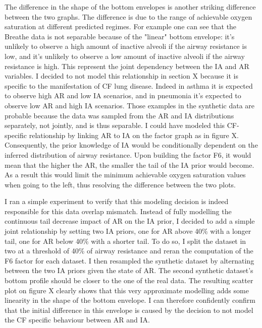 The difference in the shape of the bottom envelopes is another striking difference between the two graphs. The difference is due to the range of achievable oxygen saturation at different predicted \F regimes. 
For example one can see that the Breathe data is not separable because of the "linear" bottom envelope: it’s unlikely to observe a high amount of inactive alveoli if the airway resistance is low, and it’s unlikely to observe a low amount of inactive alveoli if the airway resistance is high. This represent the joint dependency between the IA and AR variables. I decided to not model this relationship in section X because it is specific to the manifestation of CF lung disease. Indeed in asthma it is expected to observe high AR and low IA scenarios, and in pneumonia it’s expected to observe low AR and high IA scenarios. Those examples in the synthetic data are probable because the data was sampled from the AR and IA distributions separately, not jointly, and is thus separable.
I could have modeled this CF-specific relationship by linking AR to IA on the factor graph as in figure X. Consequently, the prior knowledge of IA would be conditionally dependent on the inferred distribution of airway resistance. Upon building the factor F6, it would mean that the higher the AR, the smaller the tail of the IA prior would become. As a result this would limit the minimum achievable oxygen saturation values when going to the left, thus resolving the difference between the two plots. 

I ran a simple experiment to verify that this modeling decision is indeed responsible for this data overlap mismatch. Instead of fully modelling the continuous tail decrease impact of AR on the IA prior, I decided to add a simple joint relationship by setting two IA priors, one for AR above 40\% with a longer tail, one for AR below 40\% with a shorter tail. To do so, I split the dataset in two at a threshold of 40\% of airway resistance and reran the computation of the F6 factor for each dataset. I then resampled the synthetic dataset by alternating between the two IA priors given the state of AR. The second synthetic dataset's bottom profile should be closer to the one of the real data. The resulting scatter plot on figure X clearly shows that this very approximate modelling adds some linearity in the shape of the bottom envelope. I can therefore confidently confirm that the initial difference in this envelope is caused by the decision to not model the CF specific behaviour between AR and IA.

